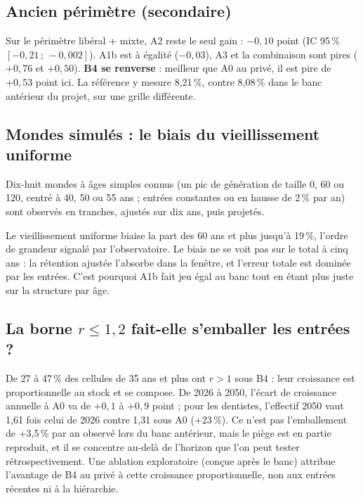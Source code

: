 \documentclass[11pt]{article}
\begin{document}
\subsection{Ancien périmètre (secondaire)}
Sur le périmètre libéral + mixte, A2 reste le seul gain : $-0{,}10$\mesure{} point
(IC 95\,\% $[-0{,}21\,;\,-0{,}002]$\mesure). A1b est à égalité ($-0{,}03$\mesure), A3 et la combinaison
sont pires ($+0{,}76$ et $+0{,}50$\mesure). \textbf{B4 se renverse} : meilleur que A0 au privé, il est
pire de $+0{,}53$\mesure{} point ici. La référence y mesure 8,21\,\%\mesure, contre 8,08\,\% dans le banc
antérieur du projet, sur une grille différente.

\subsection{Mondes simulés : le biais du vieillissement uniforme}
Dix-huit mondes à âges simples connus (un pic de génération de taille 0, 60 ou 120, centré à 40, 50 ou
55 ans ; entrées constantes ou en hausse de 2\,\% par an\suppose) sont observés en tranches, ajustés
sur dix ans, puis projetés.
\begin{table}[h]
\centering\small
{}
\caption{Erreurs en \%, mesurées\mesure{} sur mondes simulés.}
\end{table}
Le vieillissement uniforme biaise la part des 60 ans et plus jusqu'à 19\,\%\mesure, l'ordre de grandeur
signalé par l'observatoire. Le biais ne se voit pas sur le total à cinq ans : la rétention ajustée
l'absorbe dans la fenêtre\derive, et l'erreur totale est dominée par les entrées. C'est pourquoi A1b
fait jeu égal au banc tout en étant plus juste sur la structure par âge.

\subsection{La borne $r \le 1{,}2$ fait-elle s'emballer les entrées ?}
De 27 à 47\,\%\mesure{} des cellules de 35 ans et plus ont $r > 1$ sous B4 : leur croissance est
proportionnelle au stock et se compose. De 2026 à 2050, l'écart de croissance annuelle à A0 va de
$+0{,}1$ à $+0{,}9$\mesure{} point ; pour les dentistes, l'effectif 2050 vaut 1,61 fois\mesure{}
celui de 2026 contre 1,31\mesure{} sous A0 (+23\,\%\mesure). Ce n'est pas l'emballement de
+3,5\,\% par an observé lors du banc antérieur, mais le piège est en partie reproduit, et il se
concentre au-delà de l'horizon que l'on peut tester rétrospectivement. Une ablation exploratoire
(conçue après le banc) attribue l'avantage de B4 au privé à cette croissance proportionnelle, non aux
entrées récentes ni à la hiérarchie.
\end{document}
